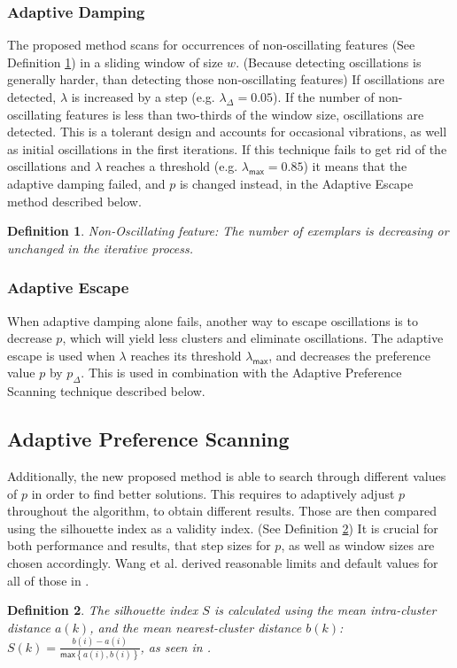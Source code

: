 \documentclass[11pt,a4paper]{article}
\newtheorem{definition}{Definition}
\begin{document}
\subsubsection{Adaptive Damping}
The proposed method scans for occurrences of non-oscillating features (See Definition \ref{def:nonosc}) in a sliding window of size $w$. (Because detecting oscillations is generally harder, than detecting those non-oscillating features) If oscillations are detected, $\lambda$ is increased by a step (e.g. $\lambda_\Delta = 0.05$). If the number of non-oscillating features is less than two-thirds of the window size, oscillations are detected. This is a tolerant design and accounts for occasional vibrations, as well as initial oscillations in the first iterations. If this technique fails to get rid of the oscillations and $\lambda$ reaches a threshold (e.g. $\lambda_{\mathsf{max}} = 0.85$) it means that the adaptive damping failed, and $p$ is changed instead, in the Adaptive Escape method described below.
\begin{definition}\label{def:nonosc}
	Non-Oscillating feature: The number of exemplars is decreasing or unchanged in the iterative process. \cite{wang2008adaptive}
\end{definition}
\subsubsection{Adaptive Escape}
When adaptive damping alone fails, another way to escape oscillations is to decrease $p$, which will yield less clusters and eliminate oscillations. The adaptive escape is used when $\lambda$ reaches its threshold $\lambda_{\mathsf{max}}$, and decreases the preference value $p$ by $p_{\Delta}$. This is used in combination with the Adaptive Preference Scanning technique described below.
\subsection{Adaptive Preference Scanning}
Additionally, the new proposed method is able to search through different values of $p$ in order to find better solutions. This requires to adaptively adjust $p$ throughout the algorithm, to obtain different results. Those are then compared using the silhouette index \cite{ROUSSEEUW198753} as a validity index. (See Definition \ref{def:silhouette}) It is crucial for both performance and results, that step sizes for $p$, as well as window sizes are chosen accordingly. Wang et al. derived reasonable limits and default values for all of those in \cite{wang2008adaptive}.
\begin{definition} \label{def:silhouette}
	The silhouette index $S$ is calculated using the mean intra-cluster distance $a(k)$, and the mean nearest-cluster distance $b(k)$: $S(k) = \frac{b(i)-a(i)}{\mathsf{max}\left\{a(i),b(i)\right\}}$, as seen in \cite{wang2008adaptive}.
\end{definition}
\end{document}
